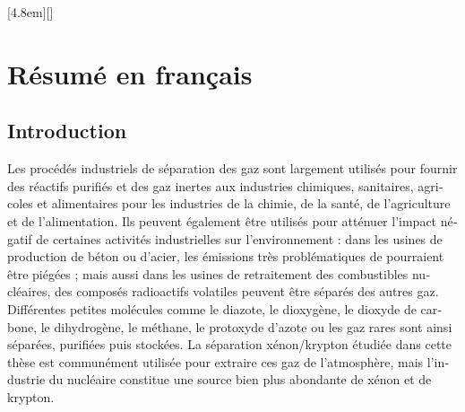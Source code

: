 \documentclass[thesis]{subfiles}
\begin{document}
\begin{otherlanguage}{french}

\renewcommand{\thesection}{\arabic{section}}
\renewcommand{\thesubsection}{\arabic{section}.\arabic{subsection}}
\renewcommand{\thefigure}{R\arabic{figure}}
\setcounter{figure}{0}
[4.8em]{\addvspace{0.1em}}{\contentslabel{2.2em}}{}{\contentspage}[]

\chapter*{Résumé en français}
\startcontents[chapters]
\printpartialtoc

\section*{Introduction}


Les procédés industriels de séparation des gaz sont largement utilisés pour fournir des réactifs purifiés et des gaz inertes aux industries chimiques, sanitaires, agricoles et alimentaires pour les industries de la chimie, de la santé, de l'agriculture et de l'alimentation. Ils peuvent également être utilisés pour atténuer l'impact négatif de certaines activités industrielles sur l'environnement : dans les usines de production de béton ou d'acier, les émissions très problématiques de  pourraient être piégées ; mais aussi dans les usines de retraitement des combustibles nucléaires, des composés radioactifs volatiles peuvent être séparés des autres gaz. Différentes petites molécules comme le diazote, le dioxygène, le dioxyde de carbone, le dihydrogène, le méthane, le protoxyde d'azote ou les gaz rares sont ainsi séparées, purifiées puis stockées. La séparation xénon/krypton étudiée dans cette thèse est communément utilisée pour extraire ces gaz de l'atmosphère, mais l'industrie du nucléaire constitue une source bien plus abondante de xénon et de krypton.


\end{otherlanguage}
\end{document}
